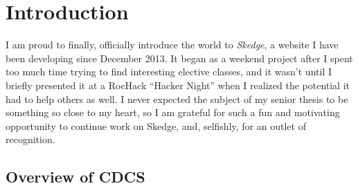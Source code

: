 
\chapter{Introduction}

\vspace{-20pt}

I am proud to finally, officially introduce the world to \emph{Skedge}, a website I have been developing since December 2013. It began as a weekend project after I spent too much time trying to find interesting elective classes, and it wasn't until I briefly presented it at a RocHack ``Hacker Night'' when I realized the potential it had to help others as well. I never expected the subject of my senior thesis to be something so close to my heart, so I am grateful for such a fun and motivating opportunity to continue work on Skedge, and, selfishly, for an outlet of recognition.

\section{Overview of CDCS}

